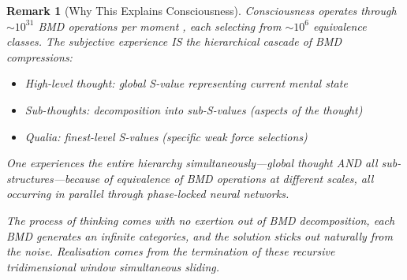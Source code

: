 \documentclass[12pt,a4paper]{article}
\newtheorem{remark}[theorem]{Remark}
\begin{document}
\begin{remark}[Why This Explains Consciousness]
Consciousness operates through $\sim 10^{31}$ BMD operations per moment \cite{sachikonye2024consciousness}, each selecting from $\sim 10^6$ equivalence classes. The subjective experience IS the hierarchical cascade of BMD compressions:

\begin{itemize}
\item High-level thought: global S-value representing current mental state
\item Sub-thoughts: decomposition into sub-S-values (aspects of the thought)
\item Qualia: finest-level S-values (specific weak force selections)
\end{itemize}

One experiences the entire hierarchy simultaneously—global thought AND all sub-structures—because of equivalence of BMD operations at different scales, all occurring in parallel through phase-locked neural networks.

The process of thinking comes with no exertion out of BMD decomposition, each BMD generates an infinite categories, and the solution sticks out naturally from the noise. Realisation comes from the termination of these recursive tridimensional window simultaneous sliding.
\end{remark}
\end{document}

